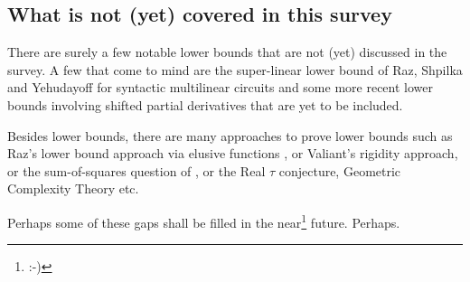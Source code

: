 \subsection*{What is not (yet) covered in this survey}

There are surely a few notable lower bounds that are not (yet) discussed in the survey.
A few that come to mind are the super-linear lower bound of Raz, Shpilka and Yehudayoff for syntactic multilinear circuits \cite{RSY08} and some more recent lower bounds involving shifted partial derivatives that are yet to be included. 

Besides lower bounds, there are many approaches to prove lower bounds such as Raz's lower bound approach via elusive functions \cite{Raz10elusive}, or Valiant's rigidity approach, or the sum-of-squares question of \cite{hwy}, or the Real $\tau$ conjecture, Geometric Complexity Theory etc.

Perhaps some of these gaps shall be filled in the near\footnote{:-)} future.
Perhaps.

